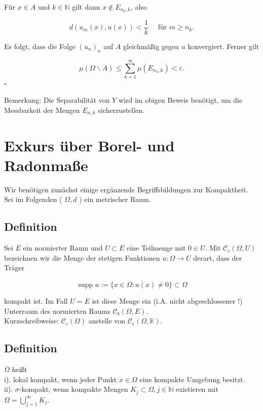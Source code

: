 \documentclass[10pt, letterpaper]{article}
\begin{document}
Für $x \in A$ und $k \in \mathbb{N}$ gilt dann $x \notin E_{n_{k}, k}$, also

$$
d\left(u_{m}(x), u(x)\right)<\frac{1}{k} \quad \text { für } m \geq n_{k} .
$$

Es folgt, dass die Folge $\left(u_{n}\right)_{n}$ auf $A$ gleichmäßig gegen $u$ konvergiert. Ferner gilt

$$
\mu(\Omega \backslash A) \leq \sum_{k=1}^{\infty} \mu\left(E_{n_{k}, k}\right)<\varepsilon .
$$ \(\square\)

Bemerkung: Die Separabilität von $Y$ wird im obigen Beweis benötigt, um die Messbarkeit der Mengen $E_{n, k}$ sicherzustellen.

\section*{Exkurs über Borel- und Radonmaße}
Wir benötigen zunächst einige ergänzende Begriffsbildungen zur Kompaktheit. Sei im Folgenden ( $\Omega, d$ ) ein metrischer Raum.

\subsection*{Definition}
Sei $E$ ein normierter Raum und $U \subset E$ eine Teilmenge mit $0 \in U$. Mit $\mathcal{C}_{c}(\Omega, U)$ bezeichnen wir die Menge der stetigen Funktionen $u: \Omega \rightarrow U$ derart, dass der Träger

$$
\operatorname{supp} u:=\overline{\{x \in \Omega: u(x) \neq 0\}} \subset \Omega
$$

kompakt ist. Im Fall $U=E$ ist diese Menge ein (i.A. nicht abgeschlossener !) Unterraum des normierten Raums $\mathcal{C}_{b}(\Omega, E)$.\\
Kurzschreibweise: $\mathcal{C}_{c}(\Omega)$ anstelle von $\mathcal{C}_{c}(\Omega, \mathbb{K})$.

\subsection*{Definition}
$\Omega$ heißt\\
i). lokal kompakt, wenn jeder Punkt $x \in \Omega$ eine kompakte Umgebung besitzt.\\
ii). $\sigma$-kompakt, wenn kompakte Mengen $K_{j} \subset \Omega, j \in \mathbb{N}$ existieren mit $\Omega=\bigcup_{j=1}^{\infty} K_{j}$.
\end{document}
